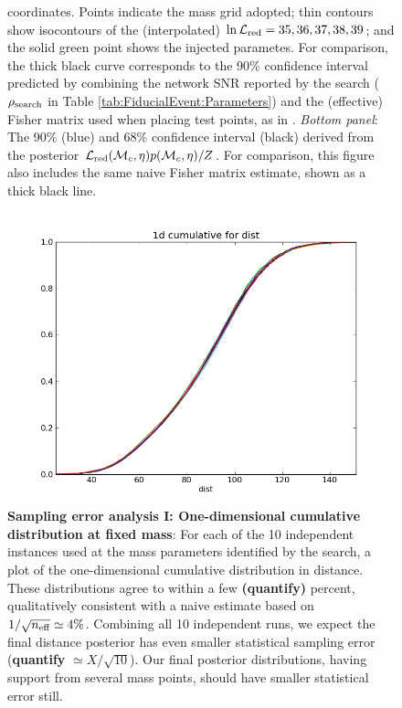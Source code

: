 \begin{figure}
{  coordinates.  Points indicate the mass grid adopted; thin contours show isocontours of the (interpolated)
  $\ln {\cal L}_{\rm red}=35,36,37,38,39$; and the solid green point shows the injected parametes.   For comparison, the thick black curve corresponds to the 90\% confidence interval
  predicted by combining the network SNR reported by the search ($\rho_{\rm search}$ in Table \ref{tab:FiducialEvent:Parameters}) and the (effective)
  Fisher matrix used when placing test points, as in \cite{gwastro-mergers-HeeSuk-FisherMatrixWithAmplitudeCorrections,gwastro-mergers-HeeSuk-CompareToPE-Aligned,gwastro-mergers-HeeSuk-CompareToPE-Precessing}.  
\emph{Bottom panel}: The 90\% (blue) and 68\% confidence interval (black) derived from the posterior ${\cal L}_{\rm red}({{\cal M}_c},\eta)
p({{\cal M}_c},\eta)/Z$.  For comparison, this figure also includes the same naive Fisher matrix estimate, shown as a thick black
 line.  
}
\end{figure}



\begin{figure}
\includegraphics[width=\columnwidth]{../Figures/v2runs_coinc_id_833_cumulative-multiplot-distance-MASS_SET_0}
\caption{\label{fig:FiducialEvent:Cumulatives:Comparison:TriggerMasses}\textbf{Sampling error analysis I: One-dimensional cumulative distribution at fixed mass}:  For each of the 10 independent
  instances used at  the mass  parameters   identified by the search, a plot of the one-dimensional cumulative
  distribution in distance.  These distributions agree to within a few \textbf{(quantify)} percent, qualitatively
  consistent with a naive estimate based on $1/\sqrt{n_{\rm eff}} \simeq 4\%$.   Combining all 10
  independent runs, we expect the final distance posterior has even smaller statistical sampling error
  (\textbf{quantify} $\simeq X/\sqrt{10}$).  Our final posterior
  distributions, having support from several mass points, should have smaller statistical error still.
}
\end{figure}


